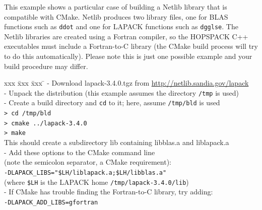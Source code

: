\bigskip
{}
This example shows a particular case of building a Netlib library that is
compatible with CMake.  Netlib produces two library files, one for BLAS
functions such as {\tt ddot} and one for LAPACK functions such as {\tt dgglse}.
The Netlib libraries
are created using a Fortran compiler, so the HOPSPACK C++ executables
must include a Fortran-to-C library (the CMake build process will try to do
this automatically).
Please note this is just one possible example and your build procedure
may differ.
\begin{tabbing}
  xxx \= xxx \= xxx \= \kill
  \> - Download {\sf lapack-3.4.0.tgz} from
       \href{http://netlib.sandia.gov/lapack/}
            {http://netlib.sandia.gov/lapack}  \\
  \> - Unpack the distribution (this example assumes the directory {\tt /tmp}
       is used) \\
  \> - Create a build directory and {\tt cd} to it;
       here, assume {\tt /tmp/bld} is used  \\
  \> \> {\tt > cd /tmp/bld}  \\
  \> \> {\tt > cmake ../lapack-3.4.0}  \\
  \> \> {\tt > make}  \\
  \> \> This should create a subdirectory {\sf lib} containing
        {\sf libblas.a} and {\sf liblapack.a}  \\
  \> - Add these options to the CMake command line  \\
  \>   \; (note the semicolon separator, a CMake requirement):  \\
  \> \> {\tt -DLAPACK\_LIBS="\$LH/liblapack.a;\$LH/libblas.a"}  \\
  \> \> (where {\tt \$LH} is the LAPACK home {\tt /tmp/lapack-3.4.0/lib})  \\
  \> - If CMake has trouble finding the Fortran-to-C library, try adding:  \\
  \> \> {\tt -DLAPACK\_ADD\_LIBS=gfortran}
\end{tabbing}
